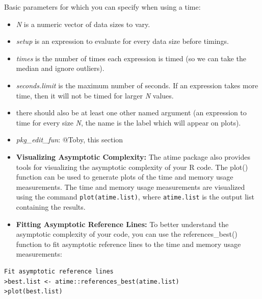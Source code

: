 \noindent Basic parameters for which you can specify when using a time:

\begin{itemize}
    \item \textit{N} is a numeric vector of data sizes to vary.
\item \textit{setup} is an expression to evaluate for every data size before timings.
\item \textit{times} is the number of times each expression is timed (so we can take the median and ignore outliers).
\item \textit{seconds.limit} is the maximum number of seconds. If an expression takes more time, then it will not be timed for larger \textit{N} values.
\item there should also be at least one other named argument (an expression to time for every size \textit{N}, the name is the label which will appear on plots).
\item \textit{pkg\_edit\_fun}: @Toby, this section

\end{itemize}

\begin{itemize}

    \item \textbf{Visualizing Asymptotic Complexity:} The atime package also provides tools for visualizing the asymptotic complexity of your R code. The plot() function can be used to generate plots of the time and memory usage measurements. The time and memory usage measurements are visualized using the command \texttt{plot(atime.list)}, where \texttt{atime.list} is the output list containing the results.

\vspace{0.1in}
\item \textbf{Fitting Asymptotic Reference Lines:} To better understand the asymptotic complexity of your code, you can use the references\_best() function to fit asymptotic reference lines to the time and memory usage measurements:

\end{itemize}

\begin{lstlisting}
Fit asymptotic reference lines
>best.list <- atime::references_best(atime.list)
>plot(best.list)
\end{lstlisting}
\vspace{0.1in}

